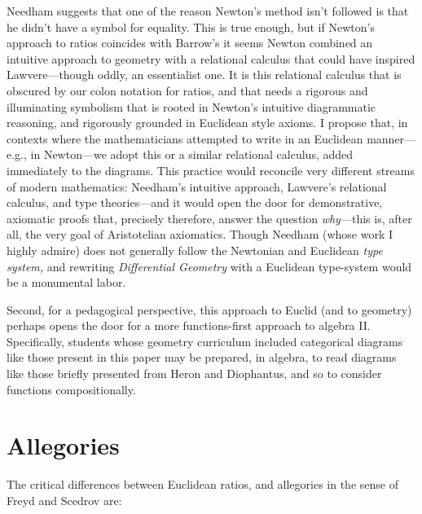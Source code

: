 \documentclass[11pt]{article}
\begin{document}
Needham \citep{needham2021} suggests that one of the reason Newton's method isn't followed is that he didn't have a symbol for equality. This is true enough, but if Newton's approach to ratios coincides with Barrow's \citep{barrow-ML} it seems Newton combined an intuitive approach to geometry with a relational calculus that could have inspired Lawvere---though oddly, an essentialist one. It is this relational calculus that is obscured by our colon notation for ratios, and that needs a rigorous and illuminating symbolism that is rooted in Newton's intuitive diagrammatic reasoning, and rigorously grounded in Euclidean style axioms. I propose that, in contexts where the mathematicians attempted to write in an Euclidean manner---e.g., in Newton---we adopt this or a similar relational calculus, added immediately to the diagrams. This practice would reconcile very different streams of modern mathematics: Needham's intuitive approach, Lawvere's relational calculus, and type theories---and it would open the door for demonstrative, axiomatic proofs that, precisely therefore, answer the question \textit{why}---this is, after all, the very goal of Aristotelian axiomatics. Though Needham (whose work I highly admire) does not generally follow the Newtonian and Euclidean \textit{type system,} and rewriting \textit{Differential Geometry} with a Euclidean type-system would be a monumental labor.

Second, for a pedagogical perspective, this approach to Euclid (and to geometry) perhaps opens the door for a more functions-first approach to algebra II. Specifically, students whose geometry curriculum included categorical diagrams like those present in this paper may be prepared, in algebra, to read diagrams like those briefly presented from Heron and Diophantus, and so to consider functions compositionally.

\appendix
\section{Allegories}\label{AppendixAllegories}
The critical differences between Euclidean ratios, and allegories in the sense of Freyd and Scedrov \citep{freyd-scedrov1990} are:
\end{document}
